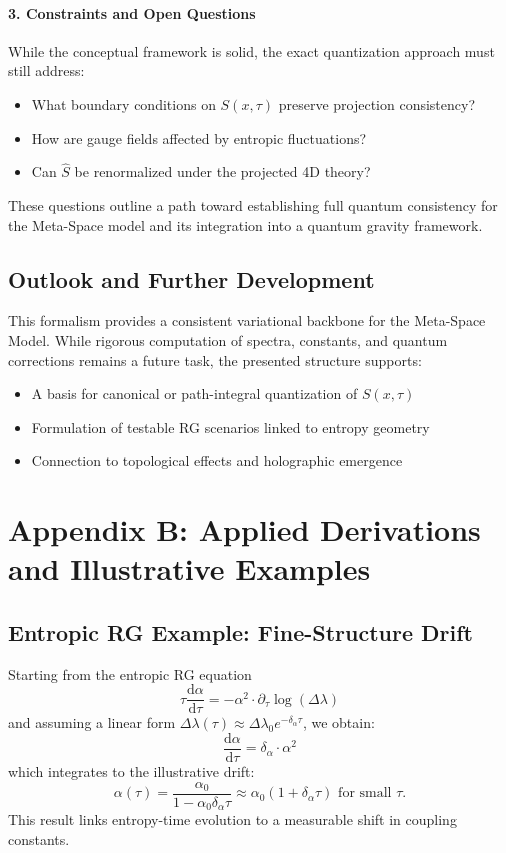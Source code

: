 \documentclass[10.5pt,a4paper]{article}
\begin{document}
\paragraph{3. Constraints and Open Questions}
While the conceptual framework is solid, the exact quantization approach must still address:
\begin{itemize}
  \item What boundary conditions on \( S(x,\tau) \) preserve projection consistency?
  \item How are gauge fields affected by entropic fluctuations?
  \item Can \( \hat{S} \) be renormalized under the projected 4D theory?
\end{itemize}
These questions outline a path toward establishing full quantum consistency for the Meta-Space model and its integration into a quantum gravity framework.

\subsection{Outlook and Further Development}
This formalism provides a consistent variational backbone for the Meta-Space Model. While rigorous computation of spectra, constants, and quantum corrections remains a future task, the presented structure supports:
\begin{itemize}
  \item A basis for canonical or path-integral quantization of \( S(x,\tau) \)
  \item Formulation of testable RG scenarios linked to entropy geometry
  \item Connection to topological effects and holographic emergence
\end{itemize}

\clearpage

\section{Appendix B: Applied Derivations and Illustrative Examples} %
\renewcommand{\thesubsection}{B.\arabic{subsection}}

\subsection{Entropic RG Example: Fine-Structure Drift}
Starting from the entropic RG equation
\[
\tau \frac{\mathrm{d}\alpha}{\mathrm{d}\tau} = -\alpha^2 \cdot \partial_\tau \log(\Delta\lambda)
\]
and assuming a linear form \( \Delta\lambda(\tau) \approx \Delta\lambda_0 e^{-\delta_\alpha \tau} \),
we obtain:
\[
\frac{\mathrm{d}\alpha}{\mathrm{d}\tau} = \delta_\alpha \cdot \alpha^2
\]
which integrates to the illustrative drift:
\[
\alpha(\tau) = \frac{\alpha_0}{1 - \alpha_0 \delta_\alpha \tau} \approx \alpha_0 (1 + \delta_\alpha \tau) \text{ for small } \tau.
\]
This result links entropy-time evolution to a measurable shift in coupling constants.
\end{document}

